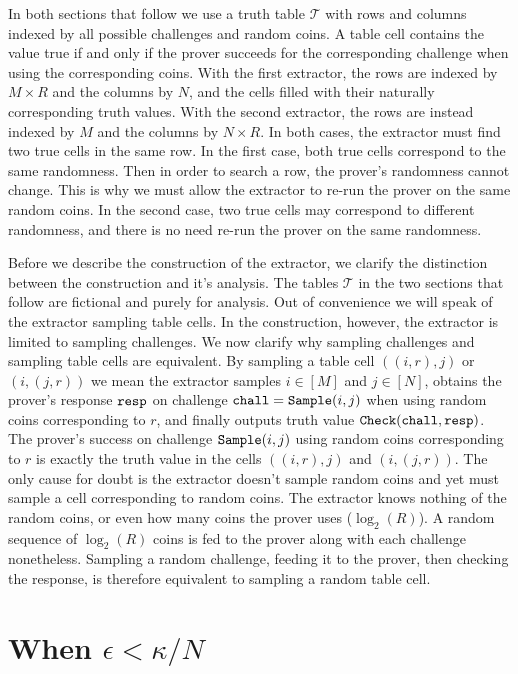 In both sections that follow we use a truth table $\mathcal{T}$ with rows and columns indexed by all possible challenges and random coins.
A table cell contains the value true if and only if the prover succeeds for the corresponding challenge when using the corresponding coins.
With the first extractor, the rows are indexed by $M\times R$ and the columns by $N$, and the cells filled with their naturally corresponding truth values.
With the second extractor, the rows are instead indexed by $M$ and the columns by $N\times R$.
In both cases, the extractor must find two true cells in the same row.
In the first case, both true cells correspond to the same randomness.
Then in order to search a row, the prover's randomness cannot change.
This is why we must allow the extractor to re-run the prover on the same random coins.
In the second case, two true cells may correspond to different randomness, and there is no need re-run the prover on the same randomness.

Before we describe the construction of the extractor, we clarify the distinction between the construction and it's analysis.
The tables $\mathcal{T}$ in the two sections that follow are fictional and purely for analysis.
Out of convenience we will speak of the extractor sampling table cells.
In the construction, however, the extractor is limited to sampling challenges.
We now clarify why sampling challenges and sampling table cells are equivalent.
By sampling a table cell $((i,r),j)$ or $(i,(j,r))$ we mean the extractor samples $i\in[M]$ and $j\in[N]$, obtains the prover's response $\mathtt{resp}$ on challenge $\mathtt{chall} = \mathtt{Sample}(i,j)$ when using random coins corresponding to $r$, and finally outputs truth value $\mathtt{Check}(\mathtt{chall},\mathtt{resp})$.
The prover's success on challenge $\mathtt{Sample}(i,j)$ using random coins corresponding to $r$ is exactly the truth value in the cells $((i,r),j)$ and $(i,(j,r))$.
The only cause for doubt is the extractor doesn't sample random coins and yet must sample a cell corresponding to random coins.
The extractor knows nothing of the random coins, or even how many coins the prover uses ($\log_2(R)$).
A random sequence of $\log_2(R)$ coins is fed to the prover along with each challenge nonetheless.
Sampling a random challenge, feeding it to the prover, then checking the response, is therefore equivalent to sampling a random table cell.


\section[When epsilon lt kappa/N]{When $\epsilon < \kappa/N$}

